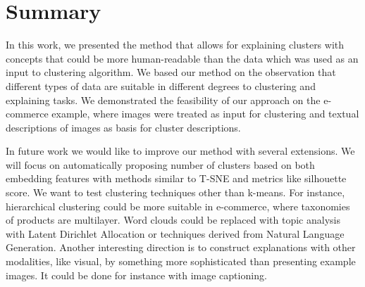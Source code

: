 \documentclass[
 twocolumn,
 hf,
]{ceurart}
\begin{document}
\section{Summary}
\label{sec:summary}
In this work, we presented the method that allows for explaining clusters with concepts that could be more human-readable than the data which was used as an input to clustering algorithm.
We based our method on the observation that different types of data are suitable in different degrees to clustering and explaining tasks.
We demonstrated the feasibility of our approach on the e-commerce example, where images were treated as input for clustering and textual descriptions of images as basis for cluster descriptions.


In future work we would like to improve our method with several extensions.
We will focus on automatically proposing number of clusters based on both embedding features with methods similar to T-SNE and metrics like silhouette score.
We want to test clustering techniques other than k-means.
For instance, hierarchical clustering could be more suitable in e-commerce, where taxonomies of products are multilayer.
Word clouds could be replaced with topic analysis with Latent Dirichlet Allocation or techniques derived from Natural Language Generation.
Another interesting direction is to construct explanations with other modalities, like visual, by something more sophisticated than presenting example images.
It could be done for instance with image captioning.
\end{document}
